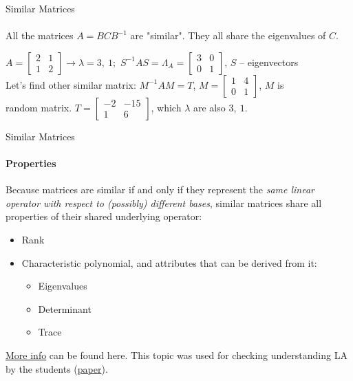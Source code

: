 \documentclass[aspectratio=169]{beamer}
\begin{document}
\begin{frame}[t]{Similar Matrices}
\framesubtitle{}
    \LARGE
    \centering
    All the matrices $A=BCB^{-1}$ are "similar". They all share the eigenvalues of $C$. \\
    \begin{example}
        \Large
        $A = \begin{bmatrix}
        2 & 1\\ 
        1 & 2 
        \end{bmatrix} \rightarrow \lambda =3,\ 1;$  $S^{-1}AS=\Lambda_{A} = \begin{bmatrix}
        3 & 0\\ 
        0 & 1 
        \end{bmatrix}$, $S$ -- eigenvectors \\ 
        \vspace{-0.4cm}
        Let's find other similar matrix: $M^{-1}AM=T$, $M=\begin{bmatrix}
        1 & 4\\ 
        0 & 1 
        \end{bmatrix}$, $M$ is \\ 
        \vspace{-0.4cm}
        random matrix. $T = \begin{bmatrix}
        -2 & -15\\ 
        1 & 6 
        \end{bmatrix}$, which $\lambda$ are also $3,\ 1$.
    \end{example}
\end{frame}

\begin{frame}[t]{Similar Matrices}
\framesubtitle{Properties}
Because matrices are similar if and only if they represent the \textit{same linear operator with respect to (possibly) different bases}, similar matrices share all properties of their shared underlying operator:
\begin{itemize}
    \item Rank
    \item Characteristic polynomial, and attributes that can be derived from it: \begin{itemize}
        \item Eigenvalues
        \item Determinant
        \item Trace
    \end{itemize}
\end{itemize}

\href{https://en.wikipedia.org/wiki/Matrix_similarity}{More info} can be found here. This topic was used for checking understanding LA by the students (\href{https://www.tandfonline.com/doi/full/10.1080/07380569.2018.1491774}{paper}).

\end{frame}
\end{document}
